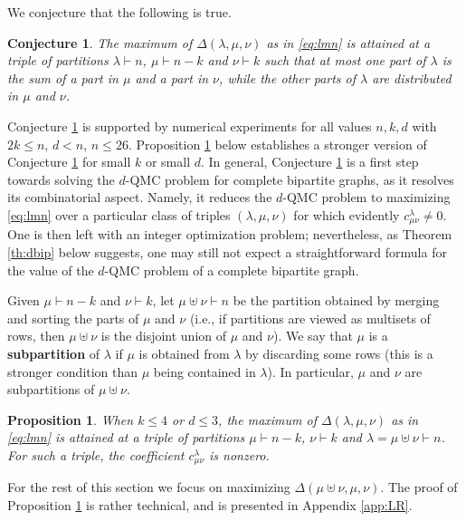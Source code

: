 \documentclass[12pt,dvipsnames,accepted=2016-08-18,a4paper,onecolumn]{quantumarticle}
\numberwithin{equation}{section}
\newtheorem{proposition}[theorem]{Proposition}
\newtheorem{conjecture}[theorem]{Conjecture}
\theoremstyle{definition}
\begin{document}
We conjecture that the following is true.

\begin{conjecture}\label{conj:bipartite}
The maximum of $\Delta(\lambda,\mu,\nu)$ as in \eqref{eq:lmn} is attained at a triple of partitions $\lambda \vdash n$,  $\mu \vdash n-k$ and $\nu \vdash k$ such that at most one part of $\lambda$ is the sum of a part in $\mu$ and a part in $\nu$, while the other parts of $\lambda$ are distributed in $\mu$ and $\nu$.
\end{conjecture}

Conjecture \ref{conj:bipartite} is supported by numerical experiments for all values $n,k,d$ with $2k \leq n$, $d < n$, $n \leq 26$. 
Proposition \ref{prop:02} below establishes a stronger version of Conjecture \ref{conj:bipartite} for small $k$ or small $d$. In general, Conjecture \ref{conj:bipartite} is a first step towards solving the $d$-QMC problem for complete bipartite graphs, as it resolves its combinatorial aspect. Namely, it reduces the $d$-QMC problem to maximizing \eqref{eq:lmn} over a particular class of triples $(\lambda,\mu,\nu)$ for which evidently $c_{\mu\nu}^\lambda\neq0$. One is then left with an integer optimization problem; nevertheless, as Theorem \ref{th:dbip} below suggests, one may still not expect a straightforward formula for the value of the $d$-QMC problem of a complete bipartite graph.

Given $\mu\vdash n-k$ and $\nu\vdash k$, let $\mu\uplus\nu\vdash n$ be the partition obtained by merging and sorting the parts of $\mu$ and $\nu$ (i.e., if partitions are viewed as multisets of rows, then $\mu\uplus\nu$ is the disjoint union of $\mu$ and $\nu$). We say that $\mu$ is a \textbf{subpartition} of $\lambda$ if $\mu$ is obtained from $\lambda$ by discarding some rows (this is a stronger condition than $\mu$ being contained in $\lambda$). In particular, $\mu$ and $\nu$ are subpartitions of $\mu\uplus\nu$.

 \begin{proposition}\label{prop:02}
When $k\leq 4$ or $d\le3$, the maximum of $\Delta(\lambda,\mu,\nu)$ as in \eqref{eq:lmn} is attained at a triple of partitions $\mu \vdash n-k$, $\nu \vdash k$ and $\lambda=\mu\uplus\nu \vdash n$. 
For such a triple, the coefficient $c^\lambda_{\mu \nu}$ is nonzero.
 \end{proposition}

For the rest of this section we focus on maximizing $\Delta(\mu\uplus\nu,\mu,\nu)$.
The proof of Proposition \ref{prop:02} is rather technical, and is presented in Appendix \ref{app:LR}.
\end{document}
